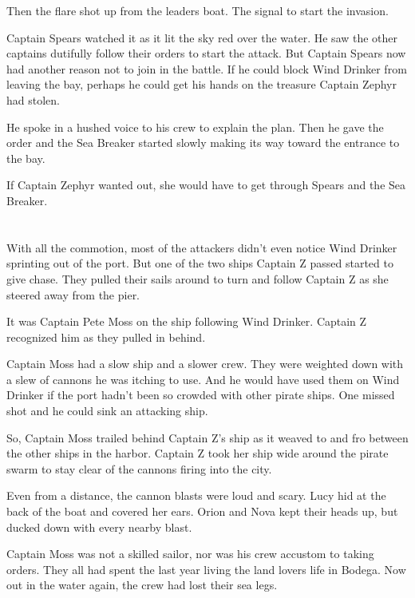 \documentclass[12pt]{extbook}
\begin{document}
  Then the flare shot up from the leaders boat. The signal to start the
  invasion.
  
  Captain Spears watched it as it lit the sky red over the water. He saw
  the other captains dutifully follow their orders to start the attack.
  But Captain Spears now had another reason not to join in the battle. If
  he could block Wind Drinker from leaving the bay, perhaps he could get
  his hands on the treasure Captain Zephyr had stolen.
  
  He spoke in a hushed voice to his crew to explain the plan. Then he gave
  the order and the Sea Breaker started slowly making its way toward the
  entrance to the bay.
  
  If Captain Zephyr wanted out, she would have to get through Spears and
  the Sea Breaker.
  
  \section{}\label{section-41}
  
  With all the commotion, most of the attackers didn't even notice Wind
  Drinker sprinting out of the port. But one of the two ships Captain Z
  passed started to give chase. They pulled their sails around to turn and
  follow Captain Z as she steered away from the pier.
  
  It was Captain Pete Moss on the ship following Wind Drinker. Captain Z
  recognized him as they pulled in behind.
  
  Captain Moss had a slow ship and a slower crew. They were weighted down
  with a slew of cannons he was itching to use. And he would have used
  them on Wind Drinker if the port hadn't been so crowded with other
  pirate ships. One missed shot and he could sink an attacking ship.
  
  So, Captain Moss trailed behind Captain Z's ship as it weaved to and fro
  between the other ships in the harbor. Captain Z took her ship wide
  around the pirate swarm to stay clear of the cannons firing into the
  city.
  
  Even from a distance, the cannon blasts were loud and scary. Lucy hid at
  the back of the boat and covered her ears. Orion and Nova kept their
  heads up, but ducked down with every nearby blast.
  
  Captain Moss was not a skilled sailor, nor was his crew accustom to
  taking orders. They all had spent the last year living the land lovers
  life in Bodega. Now out in the water again, the crew had lost their sea
  legs.
  
\end{document}
